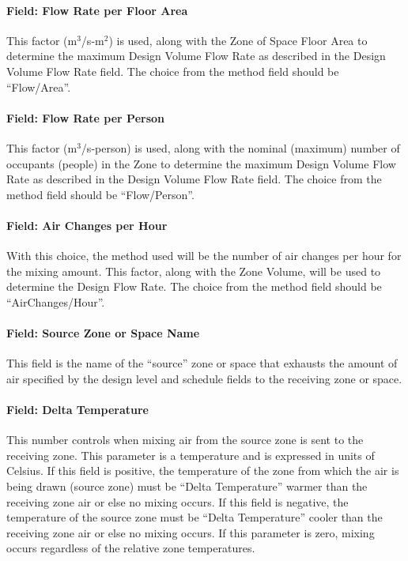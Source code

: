 \paragraph{Field: Flow Rate per Floor Area}\label{field-flow-rate-per-zone-floor-area-1}

This factor (m\(^{3}\)/s-m\(^{2}\)) is used, along with the Zone of Space Floor  Area to determine the maximum Design Volume Flow Rate as described in the Design Volume Flow Rate field. The choice from the method field should be ``Flow/Area''.

\paragraph{Field: Flow Rate per Person}\label{field-flow-rate-per-person-1}

This factor (m\(^{3}\)/s-person) is used, along with the nominal (maximum) number of occupants (people) in the Zone to determine the maximum Design Volume Flow Rate as described in the Design Volume Flow Rate field. The choice from the method field should be ``Flow/Person''.

\paragraph{Field: Air Changes per Hour}\label{field-air-changes-per-hour-2}

With this choice, the method used will be the number of air changes per hour for the mixing amount. This factor, along with the Zone Volume, will be used to determine the Design Flow Rate. The choice from the method field should be ``AirChanges/Hour''.

\paragraph{Field: Source Zone or Space Name}\label{field-source-zone-name}

This field is the name of the ``source'' zone or space that exhausts the amount of air specified by the design level and schedule fields to the receiving zone or space.

\paragraph{Field: Delta Temperature}\label{field-delta-temperature-2}

This number controls when mixing air from the source zone is sent to the receiving zone. This parameter is a temperature and is expressed in units of Celsius. If this field is positive, the temperature of the zone from which the air is being drawn (source zone) must be ``Delta Temperature'' warmer than the receiving zone air or else no mixing occurs. If this field is negative, the temperature of the source zone must be ``Delta Temperature'' cooler than the receiving zone air or else no mixing occurs. If this parameter is zero, mixing occurs regardless of the relative zone temperatures.

